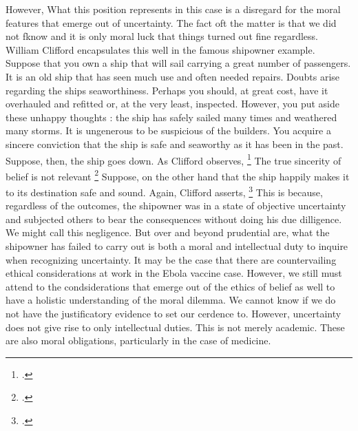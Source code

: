 \documentclass[letterpaper,notitlepage,12pt]{article}
\begin{document}
However, What this position represents in this case is a disregard for the moral
features that emerge out of uncertainty.
The fact oft the matter is that we did not fknow and it is only moral luck that
things turned out fine regardless.
William Clifford encapsulates this well in the famous shipowner example.
Suppose that you own a ship that will sail carrying a great number of
passengers.
It is an old ship that has seen much use and often needed repairs.
Doubts arise regarding the ships seaworthiness.
Perhaps you should, at great cost, have it overhauled and refitted or, at the
very least, inspected.
However, you put aside these unhappy thoughts : the ship has safely sailed many
times and weathered many storms.
It is ungenerous to be suspicious of the builders.
You acquire a sincere conviction that the ship is safe and seaworthy as it has
been in the past.
Suppose, then, the ship goes down.
As Clifford observes, \footcite{Clifford 1877 339}
The true sincerity of belief is not relevant \footcite{Clifford
  340}
Suppose, on the other hand that the ship happily makes it to its destination
safe and sound.
Again, Clifford asserts, \footcite{340}
This is because, regardless of the outcomes, the shipowner was in a state of
objective uncertainty and subjected others to bear the consequences without
doing his due dilligence.
We might call this negligence.
But over and beyond prudential are, what the shipowner has failed to carry out
is both a moral and intellectual duty to inquire when recognizing uncertainty.
It may be the case that there are countervailing ethical considerations at work
in the Ebola vaccine case.
However, we still must attend to the condsiderations that emerge out of the
ethics of belief as well to have a holistic understanding of the moral dilemma.
We cannot know if we do not have the justificatory evidence to set our cerdence
to.
However, uncertainty does not give rise to only intellectual duties.
This is not merely academic.
These are also moral obligations, particularly in the case of medicine.
\end{document}

